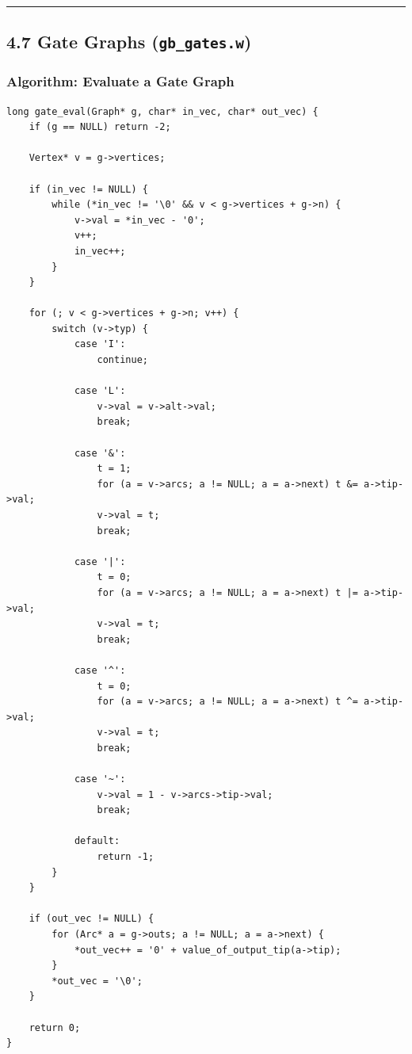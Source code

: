 \documentclass[11pt]{article}
\begin{document}
\begin{center}\rule{0.5\linewidth}{0.5pt}\end{center}

\subsection{\texorpdfstring{4.7 Gate Graphs (\texttt{gb\_gates.w})}{4.7 Gate Graphs (gb\_gates.w)}}\label{gate-graphs-gb_gates.w}

\subsubsection{Algorithm: Evaluate a Gate Graph}\label{algorithm-evaluate-a-gate-graph}

\begin{verbatim}
long gate_eval(Graph* g, char* in_vec, char* out_vec) {
    if (g == NULL) return -2;

    Vertex* v = g->vertices;

    if (in_vec != NULL) {
        while (*in_vec != '\0' && v < g->vertices + g->n) {
            v->val = *in_vec - '0';
            v++;
            in_vec++;
        }
    }

    for (; v < g->vertices + g->n; v++) {
        switch (v->typ) {
            case 'I':
                continue;

            case 'L':
                v->val = v->alt->val;
                break;

            case '&':
                t = 1;
                for (a = v->arcs; a != NULL; a = a->next) t &= a->tip->val;
                v->val = t;
                break;

            case '|':
                t = 0;
                for (a = v->arcs; a != NULL; a = a->next) t |= a->tip->val;
                v->val = t;
                break;

            case '^':
                t = 0;
                for (a = v->arcs; a != NULL; a = a->next) t ^= a->tip->val;
                v->val = t;
                break;

            case '~':
                v->val = 1 - v->arcs->tip->val;
                break;

            default:
                return -1;
        }
    }

    if (out_vec != NULL) {
        for (Arc* a = g->outs; a != NULL; a = a->next) {
            *out_vec++ = '0' + value_of_output_tip(a->tip);
        }
        *out_vec = '\0';
    }

    return 0;
}
\end{verbatim}
\end{document}
